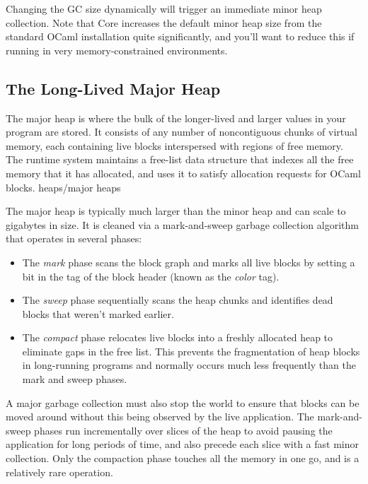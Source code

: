 Changing the GC size dynamically will trigger an immediate minor heap
collection. Note that Core increases the default minor heap size from
the standard OCaml installation quite significantly, and you'll want to
reduce this if running in very memory-constrained environments.

\hypertarget{the-long-lived-major-heap}{%
\subsection{The Long-Lived Major Heap}\label{the-long-lived-major-heap}}

The major heap is where the bulk of the longer-lived and larger values
in your program are stored. It consists of any number of noncontiguous
chunks of virtual memory, each containing live blocks interspersed with
regions of free memory. The runtime system maintains a free-list data
structure that indexes all the free memory that it has allocated, and
uses it to satisfy allocation requests for OCaml blocks.
\protect\hypertarget{Hmh}{}{heaps/major
heaps}

The major heap is typically much larger than the minor heap and can
scale to gigabytes in size. It is cleaned via a mark-and-sweep garbage
collection algorithm that operates in several phases:

\begin{itemize}
\item
  The \emph{mark} phase scans the block graph and marks all live blocks
  by setting a bit in the tag of the block header (known as the
  \emph{color} tag).
\item
  The \emph{sweep} phase sequentially scans the heap chunks and
  identifies dead blocks that weren't marked earlier.
\item
  The \emph{compact} phase relocates live blocks into a freshly
  allocated heap to eliminate gaps in the free list. This prevents the
  fragmentation of heap blocks in long-running programs and normally
  occurs much less frequently than the mark and sweep {phases}.
\end{itemize}

A major garbage collection must also stop the world to ensure that
blocks can be moved around without this being observed by the live
application. The mark-and-sweep phases run incrementally over slices of
the heap to avoid pausing the application for long {periods} of time,
and also precede each slice with a fast minor collection. Only the
compaction phase touches all the memory in one go, and is a relatively
rare operation.

